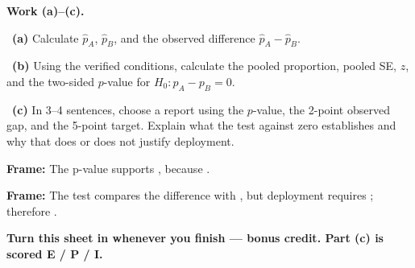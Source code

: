\documentclass[11pt]{article}
\begin{document}
\newpage
\textbf{Work (a)--(c).}\par\smallskip

~\textbf{(a)} Calculate $\hat p_A$, $\hat p_B$, and the observed difference $\hat p_A-\hat p_B$.\par
\workspace{0.7in}

~\textbf{(b)} Using the verified conditions, calculate the pooled proportion, pooled SE, $z$, and the two-sided $p$-value for $H_0:p_A-p_B=0$.\par
\workspace{1.4in}

~\textbf{(c)} In 3--4 sentences, choose a report using the $p$-value, the 2-point observed gap, and the 5-point target. Explain what the test against zero establishes and why that does or does not justify deployment.\par
\workspace{2.0in}

\begin{sentenceframebox}\raggedright\textbf{Frame:} The p-value supports \blank[2.0in], because \blank[1.8in].\end{sentenceframebox}

\begin{sentenceframebox}\raggedright\textbf{Frame:} The test compares the difference with \blank[0.7in], but deployment requires \blank[1.1in]; therefore \blank[2.0in].\end{sentenceframebox}

\textbf{Turn this sheet in whenever you finish --- bonus credit. Part (c) is scored E / P / I.}\par
\end{document}
